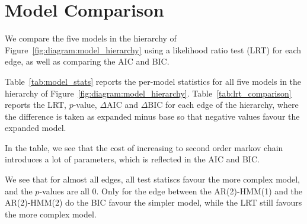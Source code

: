 \section{Model Comparison}

We compare the five models in the hierarchy of Figure~\ref{fig:diagram:model_hierarchy} using a likelihood ratio test (LRT) for each edge, 
as well as comparing the AIC and BIC.

Table~\ref{tab:model_stats} reports the per-model statistics for all five
models in the hierarchy of Figure~\ref{fig:diagram:model_hierarchy}.
Table~\ref{tab:lrt_comparison} reports the LRT, $p$-value, $\Delta\text{AIC}$
and $\Delta\text{BIC}$ for each edge of the hierarchy, where the difference
is taken as expanded minus base so that negative values favour the expanded
model.


In the table, we see that the cost of increasing to second order markov chain
introduces a lot of parameters, which is reflected in the AIC and BIC.



We see that for almost all edges, all test statiscs favour the more complex model, 
and the $p$-values are all 0. Only for the edge between 
the AR(2)-HMM(1) and the AR(2)-HMM(2) 
do the BIC favour the simpler model, 
while the LRT still favours the more complex model.  